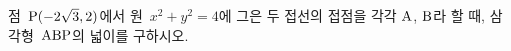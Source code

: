 점~$\mathrm{P}(-2\sqrt{3}{,}\mkern3mu\mathopen{}2)$에서 원~$x^2+y^2=4$에 그은 두 접선의 접점을 각각 $\mathrm{A}$, $\mathrm{B}$라 할 때, 삼각형~$\mathrm{ABP}$의 넓이를 구하시오.
